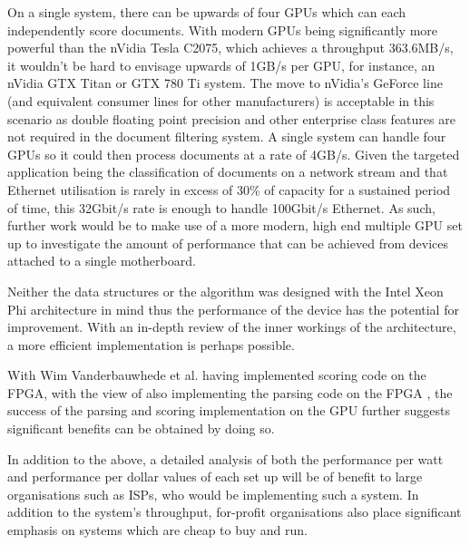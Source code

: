 On a single system, there can be upwards of four GPUs which can each
independently score documents. With modern GPUs being significantly more
powerful than the nVidia Tesla C2075, which achieves a throughput 363.6MB/s, it
wouldn't be hard to envisage upwards of 1GB/s per GPU, for instance, an nVidia
GTX Titan or GTX 780 Ti system. The move to nVidia's GeForce line (and
equivalent consumer lines for other manufacturers) is acceptable in this
scenario as double floating point precision and other enterprise class features
are not required in the document filtering system. A single system can handle
four GPUs so it could then process documents at a rate of 4GB/s. Given the
targeted application being the classification of documents on a network stream
and that Ethernet utilisation is rarely in excess of 30\% of capacity for a
sustained period of time, this 32Gbit/s rate is enough to handle 100Gbit/s
Ethernet. As such, further work would be to make use of a more modern, high end
multiple GPU set up to investigate the amount of performance that can be
achieved from devices attached to a single motherboard.

Neither the data structures or the algorithm was designed with the Intel Xeon
Phi architecture in mind thus the performance of the device has the potential
for improvement. With an in-depth review of the inner workings of the
architecture, a more efficient implementation is perhaps possible.

With Wim Vanderbauwhede et al. having implemented scoring code on the FPGA, with
the view of also implementing the parsing code on the FPGA \cite{HybridCPUFPGA},
the success of the parsing and scoring implementation on the GPU further
suggests significant benefits can be obtained by doing so.

In addition to the above, a detailed analysis of both the performance per watt
and performance per dollar values of each set up will be of benefit to large
organisations such as ISPs, who would be implementing such a system. In addition
to the system's throughput, for-profit organisations also place significant
emphasis on systems which are cheap to buy and run.
